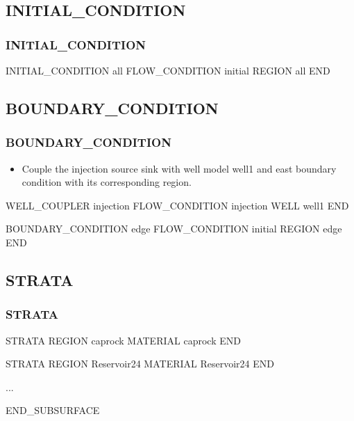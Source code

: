 \documentclass{beamer}
\newcommand\greencomment[1]{{{\color{green} #1}}}
\begin{document}
\subsection{INITIAL\_CONDITION}

\begin{frame}[fragile]\frametitle{INITIAL\_CONDITION}

\begin{semiverbatim}
INITIAL_CONDITION all
  FLOW_CONDITION initial
  REGION all
END

\end{semiverbatim}

\end{frame}

\subsection{BOUNDARY\_CONDITION}

\begin{frame}[fragile]\frametitle{BOUNDARY\_CONDITION}

\begin{itemize}
\item Couple the \greencomment{injection} source sink with well model \greencomment{well1} and \greencomment{east} boundary condition with its corresponding region.
\end{itemize}

\begin{semiverbatim}
WELL_COUPLER injection
  FLOW_CONDITION injection
  WELL well1
END

BOUNDARY_CONDITION edge
  FLOW_CONDITION initial
  REGION edge
END
\end{semiverbatim}

\end{frame}


\subsection{STRATA}

\begin{frame}[fragile]\frametitle{STRATA}

\begin{semiverbatim}

STRATA
  REGION caprock
  MATERIAL caprock
END

STRATA
  REGION Reservoir24
  MATERIAL Reservoir24
END

...

END_SUBSURFACE
\end{semiverbatim}

\end{frame}
\end{document}
